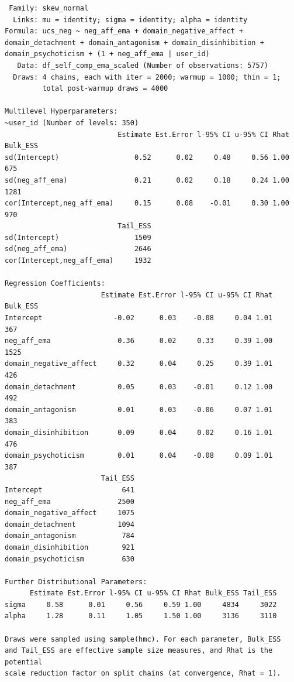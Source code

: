 \documentclass[
  11pt,
  a4paper,
  onecolumn]{article}
\begin{document}
\begin{verbatim}
 Family: skew_normal 
  Links: mu = identity; sigma = identity; alpha = identity 
Formula: ucs_neg ~ neg_aff_ema + domain_negative_affect + domain_detachment + domain_antagonism + domain_disinhibition + domain_psychoticism + (1 + neg_aff_ema | user_id) 
   Data: df_self_comp_ema_scaled (Number of observations: 5757) 
  Draws: 4 chains, each with iter = 2000; warmup = 1000; thin = 1;
         total post-warmup draws = 4000

Multilevel Hyperparameters:
~user_id (Number of levels: 350) 
                           Estimate Est.Error l-95% CI u-95% CI Rhat Bulk_ESS
sd(Intercept)                  0.52      0.02     0.48     0.56 1.00      675
sd(neg_aff_ema)                0.21      0.02     0.18     0.24 1.00     1281
cor(Intercept,neg_aff_ema)     0.15      0.08    -0.01     0.30 1.00      970
                           Tail_ESS
sd(Intercept)                  1509
sd(neg_aff_ema)                2646
cor(Intercept,neg_aff_ema)     1932

Regression Coefficients:
                       Estimate Est.Error l-95% CI u-95% CI Rhat Bulk_ESS
Intercept                 -0.02      0.03    -0.08     0.04 1.01      367
neg_aff_ema                0.36      0.02     0.33     0.39 1.00     1525
domain_negative_affect     0.32      0.04     0.25     0.39 1.01      426
domain_detachment          0.05      0.03    -0.01     0.12 1.00      492
domain_antagonism          0.01      0.03    -0.06     0.07 1.01      383
domain_disinhibition       0.09      0.04     0.02     0.16 1.01      476
domain_psychoticism        0.01      0.04    -0.08     0.09 1.01      387
                       Tail_ESS
Intercept                   641
neg_aff_ema                2500
domain_negative_affect     1075
domain_detachment          1094
domain_antagonism           784
domain_disinhibition        921
domain_psychoticism         630

Further Distributional Parameters:
      Estimate Est.Error l-95% CI u-95% CI Rhat Bulk_ESS Tail_ESS
sigma     0.58      0.01     0.56     0.59 1.00     4834     3022
alpha     1.28      0.11     1.05     1.50 1.00     3136     3110

Draws were sampled using sample(hmc). For each parameter, Bulk_ESS
and Tail_ESS are effective sample size measures, and Rhat is the potential
scale reduction factor on split chains (at convergence, Rhat = 1).
\end{verbatim}
\end{document}
